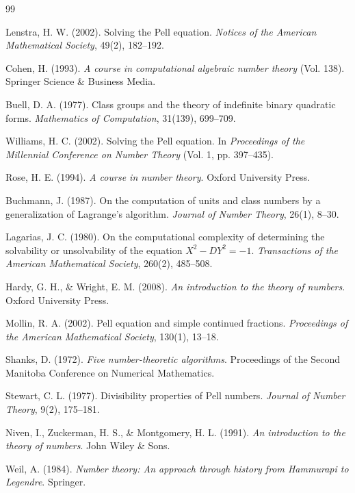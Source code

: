 \documentclass[12pt]{article}
\begin{document}
\begin{thebibliography}{99}

Lenstra, H. W. (2002). Solving the Pell equation. \emph{Notices of the American Mathematical Society}, 49(2), 182--192.

Cohen, H. (1993). \emph{A course in computational algebraic number theory} (Vol. 138). Springer Science \& Business Media.

Buell, D. A. (1977). Class groups and the theory of indefinite binary quadratic forms. \emph{Mathematics of Computation}, 31(139), 699--709.

Williams, H. C. (2002). Solving the Pell equation. In \emph{Proceedings of the Millennial Conference on Number Theory} (Vol. 1, pp. 397--435).

Rose, H. E. (1994). \emph{A course in number theory}. Oxford University Press.

Buchmann, J. (1987). On the computation of units and class numbers by a generalization of Lagrange's algorithm. \emph{Journal of Number Theory}, 26(1), 8--30.

Lagarias, J. C. (1980). On the computational complexity of determining the solvability or unsolvability of the equation $X^2-DY^2=-1$. \emph{Transactions of the American Mathematical Society}, 260(2), 485--508.

Hardy, G. H., \& Wright, E. M. (2008). \emph{An introduction to the theory of numbers}. Oxford University Press.

Mollin, R. A. (2002). Pell equation and simple continued fractions. \emph{Proceedings of the American Mathematical Society}, 130(1), 13--18.

Shanks, D. (1972). \emph{Five number-theoretic algorithms}. Proceedings of the Second Manitoba Conference on Numerical Mathematics.

Stewart, C. L. (1977). Divisibility properties of Pell numbers. \emph{Journal of Number Theory}, 9(2), 175--181.

Niven, I., Zuckerman, H. S., \& Montgomery, H. L. (1991). \emph{An introduction to the theory of numbers}. John Wiley \& Sons.

Weil, A. (1984). \emph{Number theory: An approach through history from Hammurapi to Legendre}. Springer.


\end{thebibliography}
\end{document}
